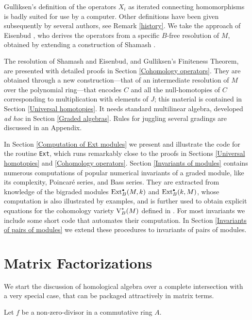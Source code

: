 Gulliksen's definition of the operators $X_i$ as iterated connecting
homomorphisms is badly suited for use by a computer.  Other definitions
have been given subsequently by several authors, see Remark
\ref{history}.  We take the approach of Eisenbud \cite{CI:Ei}, who
derives the operators from a specific $B$-free resolution of $M$,
obtained by extending a construction of Shamash \cite{CI:Sh}.

The resolution of Shamash and Eisenbud, and Gulliksen's Finiteness
Theorem, are presented with detailed proofs in Section \ref{Cohomology
operators}.  They are obtained through a new construction---that of an
intermediate resolution of $M$ over the polynomial ring---that encodes
$C$ and all the null-homotopies of $C$ corresponding to multiplication
with elements of $J$; this material is contained in Section
\ref{Universal homotopies}.  It needs standard multilinear algebra,
developed {\sl ad hoc\/} in Section \ref{Graded algebras}.  Rules for
juggling several gradings are discussed in an Appendix.

In Section \ref{Computation of Ext modules} we present and illustrate
the code for the routine {\tt Ext}, which runs remarkably close to the
proofs in Sections \ref{Universal homotopies} and \ref{Cohomology
operators}.  Section \ref{Invariants of modules} contains numerous
computations of popular numerical invariants of a graded module, like
its complexity, Poincar\'e series, and Bass series.  They are extracted
from knowledge of the bigraded modules $\operatorname{Ext}^{\scriptscriptstyle\bullet}_B(M,k)$ and
$\operatorname{Ext}^{\scriptscriptstyle\bullet}_B(k,M)$, whose computation is also illustrated by examples,
and is further used to obtain explicit equations for the cohomology
variety $\operatorname{V}^*_B(M)$ defined in \cite{CI:MR90g:13027}.  For most
invariants we include some short code that automates their
computation.  In Section \ref{Invariants of pairs of modules} we
extend these procedures to invariants of pairs of modules.

\section{Matrix Factorizations}
\label{Matrix factorizations}

We start the discussion of homological algebra over a complete
intersection with a very special case, that can be packaged
attractively in matrix terms.

Let $f$ be a non-zero-divisor in a commutative ring $A$.


